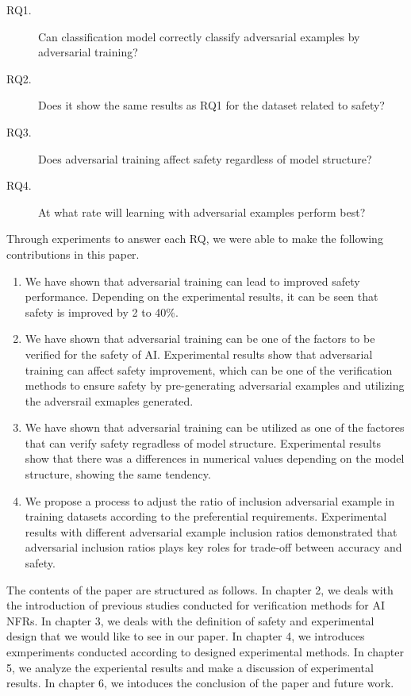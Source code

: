 \documentclass[journal,article,submit,moreauthors,pdftex]{Definitions/mdpi}
\begin{document}
\begin{description}
    \item[RQ1.]	Can classification model correctly classify adversarial examples by adversarial training?
    \item[RQ2.]	Does it show the same results as RQ1 for the dataset related to safety?
    \item[RQ3.] Does adversarial training affect safety regardless of model structure?
    \item[RQ4.]	At what rate will learning with adversarial examples perform best?
\end{description}

Through experiments to answer each RQ, we were able to make the following contributions in this paper.

\begin{enumerate}
    \item	We have shown that adversarial training can lead to improved safety performance. Depending on the experimental results, it can be seen that safety is improved by 2 to 40\%.
    \item	We have shown that adversarial training can be one of the factors to be verified for the safety of AI. Experimental results show that adversarial training can affect safety improvement, which can be one of the verification methods to ensure safety by pre-generating adversarial examples and utilizing the adversrail exmaples generated.
    \item   We have shown that adversarial training can be utilized as one of the factores that can verify safety regradless of model structure. Experimental results show that there was a differences in numerical values depending on the model structure, showing the same tendency.
    \item	We propose a process to adjust the ratio of inclusion adversarial example in training datasets according to the preferential requirements. Experimental results with different adversarial example inclusion ratios demonstrated that adversarial inclusion ratios plays key roles for trade-off between accuracy and safety.
\end{enumerate} 

The contents of the paper are structured as follows. In chapter 2, we deals with the introduction of previous studies conducted for verification methods for AI NFRs.
In chapter 3, we deals with the definition of safety and experimental design that we would like to see in our paper.
In chapter 4, we introduces exmperiments conducted according to designed experimental methods.
In chapter 5, we analyze the experiental results and make a discussion of experimental results.
In chapter 6, we intoduces the conclusion of the paper and future work.
\end{document}
